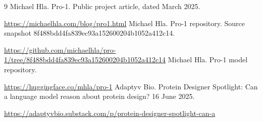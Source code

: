 \documentclass[10pt,a4paper]{article}
\begin{document}
\begin{thebibliography}{9}
\small
{} Michael Hla. Pro-1. Public project article, dated March 2025.\par\url{https://michaelhla.com/blog/pro1.html}
 Michael Hla. Pro-1 repository. Source snapshot 8f488bdd4fa839ec93a152600204b1052a412c14.\par\url{https://github.com/michaelhla/pro-1/tree/8f488bdd4fa839ec93a152600204b1052a412c14}
 Michael Hla. Pro-1 model repository.\par\url{https://huggingface.co/mhla/pro-1}
 Adaptyv Bio. Protein Designer Spotlight: Can a language model reason about protein design? 16 June 2025.\par\url{https://adaptyvbio.substack.com/p/protein-designer-spotlight-can-a}
\end{thebibliography}
\end{document}
